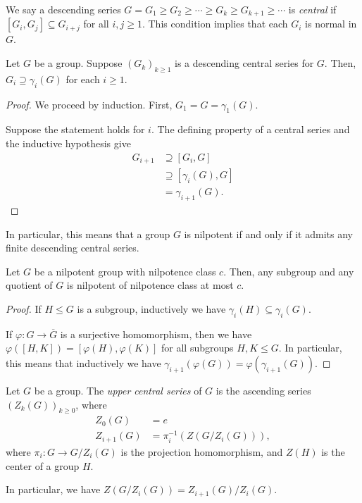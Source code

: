 \documentclass[10pt]{mypackage}
\begin{document}
We say a descending series $G = G_1\geq G_2\geq\cdots\geq G_k\geq G_{k+1}\geq\cdots$ is \textit{central} if $ \left[ G_i,G_j \right]\subseteq G_{i + j} $ for all $i,j\geq 1$. This condition implies that each $G_i$ is normal in $G$.
\begin{lemma}
  Let $G$ be a group. Suppose $\left( G_k \right)_{k\geq 1}$ is a descending central series for $G$. Then, $G_i\supseteq \gamma_i(G)$ for each $i\geq 1$.
\end{lemma}
\begin{proof}
  We proceed by induction. First, $G_1 = G = \gamma_1(G)$.

  Suppose the statement holds for $i$. The defining property of a central series and the inductive hypothesis give
  \begin{align*}
    G_{i+1} &\supseteq \left[ G_i,G \right]\\
    &\supseteq \left[ \gamma_i(G),G \right]\\
    &= \gamma_{i+1}(G).
  \end{align*}
\end{proof}
In particular, this means that a group $G$ is nilpotent if and only if it admits any finite descending central series.
\begin{proposition}
  Let $G$ be a nilpotent group with nilpotence class $c$. Then, any subgroup and any quotient of $G$ is nilpotent of nilpotence class at most $c$.
\end{proposition}
\begin{proof}
  If $H\leq G$ is a subgroup, inductively we have $\gamma_i(H)\subseteq \gamma_i(G)$.

  If $\varphi\colon G\rightarrow \overline{G}$ is a surjective homomorphism, then we have $\varphi\left( \left[ H,K \right] \right) = \left[ \varphi\left( H \right),\varphi\left( K \right) \right]$ for all subgroups $H,K\leq G$. In particular, this means that inductively we have $\gamma_{i+1}\left( \varphi(G) \right) = \varphi\left( \gamma_{i+1}(G) \right)$.
\end{proof}
\begin{definition}
  Let $G$ be a group. The \textit{upper central series} of $G$ is the ascending series $\left( Z_k(G) \right)_{k\geq 0}$, where
  \begin{align*}
    Z_0(G) &= e\\
    Z_{i+1}(G) &= \pi_i^{-1}\left( Z\left( G/Z_i(G) \right) \right),
  \end{align*}
  where $\pi_i\colon G\rightarrow G/Z_i(G)$ is the projection homomorphism, and $Z(H)$ is the center of a group $H$.
\end{definition}
In particular, we have $Z\left( G/Z_i(G) \right) = Z_{i+1}(G)/Z_i(G)$.
\end{document}
